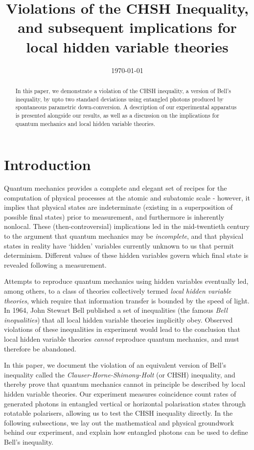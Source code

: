 \documentclass[aps,prl,nofootinbib,twocolumn,superscriptaddress,groupedaddress]{revtex4}  %
\begin{document}
\title{Violations of the CHSH Inequality, and subsequent implications for local hidden variable theories}
\date{\today}

\begin{abstract}
In this paper, we demonstrate a violation of the CHSH inequality, a version of Bell's inequality, by upto two standard deviations using entangled photons produced by spontaneous parametric down-conversion. A description of our experimental apparatus is presented alongside our results, as well as a discussion on the implications for quantum mechanics and local hidden variable theories. 
\end{abstract}

\maketitle

\section{Introduction}

Quantum mechanics provides a complete and elegant set of recipes for the computation of physical processes at the atomic and subatomic scale - however, it implies that physical states are indeterminate (existing in a superposition of possible final states) prior to measurement, and furthermore is inherently nonlocal. These (then-controversial) implications led in the mid-twentieth century to the argument that quantum mechanics may be \textsl{incomplete}, and that physical states in reality have `hidden' variables currently unknown to us that permit determinism. Different values of these hidden variables govern which final state is revealed following a measurement. 

Attempts to reproduce quantum mechanics using hidden variables eventually led, among others, to a class of theories collectively termed \textsl{local hidden variable theories}, which require that information transfer is bounded by the speed of light. In 1964, John Stewart Bell published a set of inequalities (the famous \textsl{Bell inequalities}) that all local hidden variable theories implicitly obey. Observed violations of these inequalities in experiment would lead to the conclusion that local hidden variable theories \textit{cannot} reproduce quantum mechanics, and must therefore be abandoned.

In this paper, we document the violation of an equivalent version of Bell's inequality called the \textit{Clauser-Horne-Shimony-Holt} (or CHSH) inequality, and thereby prove that quantum mechanics cannot in principle be described by local hidden variable theories. Our experiment measures coincidence count rates of generated photons in entangled vertical or horizontal polarisation states through rotatable polarisers, allowing us to test the CHSH inequality directly. In the following subsections, we lay out the mathematical  and physical groundwork behind our experiment, and explain how entangled photons can be used to define Bell's inequality.
\end{document}
